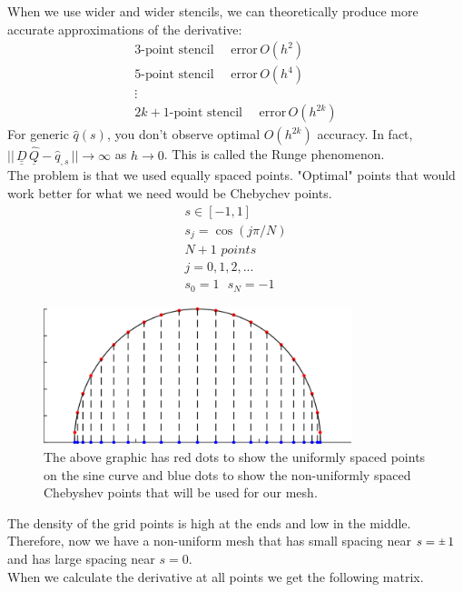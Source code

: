 \documentclass[12pt]{article}
\newcommand{\rpm}{\raisebox{.2ex}{$\scriptstyle\pm$}}
\def \lra {\longrightarrow}
\newcommand{\bunderline}[1]{\underline{#1}}
\renewcommand{\vec}[1]{{\bunderline{#1}}}
\newcommand{\mat}[1]{{\bunderline{\bunderline{#1}}}}
\begin{document}
When we use wider and wider stencils, we can theoretically produce more accurate approximations of the derivative:
\begin{align*}
\text{3-point stencil}\,\,\,\,\,\,\,\, \text{error}\,O(h^2) \\
\text{5-point stencil}\,\,\,\,\,\,\,\, \text{error}\,O(h^4) \\
\vdots\,\,\,\,\,\,\,\,\,\,\,\,\,\,\,\,\,\,\,\,\,\,\,\,\,\,\,\,\,\,\,\, \\
2k+1\text{-point stencil}\,\,\,\,\,\,\,\, \text{error}\,O(h^{2k})
\end{align*}
For generic $\widehat{q}(s)$, you don't observe optimal $O(h^{2k})$ accuracy. In fact, $|| \,\mat{D}\,\widehat{\vec{Q}} - \widehat{q}_{,s}\, || \lra \infty$ as $h \lra 0$. This is called the Runge phenomenon. \\
The problem is that we used equally spaced points. 
"Optimal" points that would work better for what we need would be Chebychev points. 
\begin{align*}
s \in [-1,1] \\
s_j = \cos(j\pi/N) \\
N+1 \,\, points \\
j = 0, 1, 2, . . .  \\
s_0 = 1 \,\,\,\,
s_N = -1
\end{align*}
\begin{figure}[H]
\centering
\includegraphics[width=0.8\textwidth]{ChebyshevPoints.jpg}
\caption{The above graphic has red dots to show the uniformly spaced points on the sine curve and blue dots to show the non-uniformly spaced Chebyshev points that will be used for our mesh.}
\end{figure}
The density of the grid points is high at the ends and low in the middle. Therefore, now we have a non-uniform mesh that has small spacing near $s = \rpm\,1$ and has large spacing near $s = 0$.\\
When we calculate the derivative at all points we get the following matrix. \\
\end{document}
